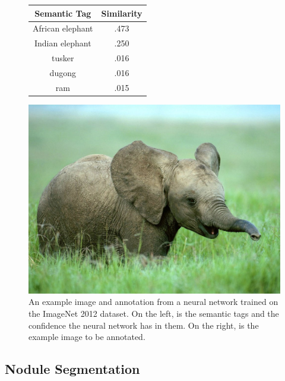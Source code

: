 \documentclass[conference,11pt]{IEEEtran}
\begin{document}
\begin{figure}[htb]
  \centering
  \begin{minipage}[c]{0.38\textwidth}
    \centering
    \begin{tabular} {|c|c|}
            \hline
            \textnormal{Semantic Tag} & \textnormal{Similarity} \\ \hline
           African elephant & .473 \\ \hline
           Indian elephant & .250 \\ \hline
           tusker & .016 \\ \hline
           dugong & .016\\ \hline
           ram & .015 \\ \hline
          \end{tabular}
  \end{minipage}
  \begin{minipage}[c]{0.58\textwidth}
    \includegraphics[width=\textwidth]{figures/plot_elephant.jpg}
  \end{minipage}
  \caption{An example image and annotation from a neural network trained on the ImageNet 2012 dataset. On the left, is the semantic tags and the confidence the neural network has in them. On the right, is the example image to be annotated.}
  \label{fig:elephant}
\end{figure}

\subsection{Nodule Segmentation}
\end{document}
